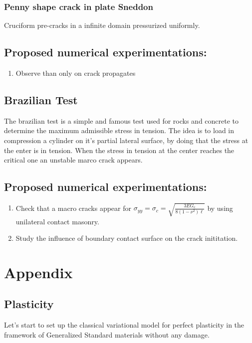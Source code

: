 \documentclass[10pt,oneside]{report}
\begin{document}
\subsection{Penny shape crack in plate Sneddon}
Cruciform pre-cracks in a infinite domain pressurized uniformly.

\section*{Proposed numerical experimentations:}
\begin{enumerate}
\item Observe than only on crack propagates
\end{enumerate}


\section{Brazilian Test}
The brazilian test is a simple and famous test used for rocks and concrete to determine the maximum admissible stress in tension. The idea is to load in compression a cylinder on it’s partial lateral surface, by doing that the stress at the enter is in tension. When the stress in tension at the center reaches the critical one an unstable marco crack appears.
\section*{Proposed numerical experimentations:}
\begin{enumerate}
\item Check that a macro cracks appear for $\sigma_{yy} = \sigma_c =  \sqrt{\frac{3EG_c}{8(1-\nu^2)\ell}} $ by using unilateral contact masonry.
\item Study the influence of boundary contact surface on the crack inititation.
\end{enumerate}



\appendix
\renewcommand{\thechapter}{A}
\chapter{Appendix}
\section{Plasticity}
\label{sec:Plasticity}
Let's start to set up the classical variational model for perfect plasticity in the framework of Generalized Standard materials without any damage.
\end{document}
